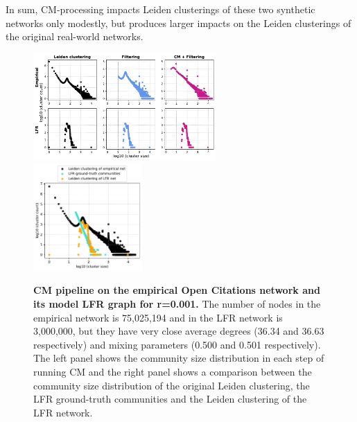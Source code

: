 \documentclass[11pt]{article}   	%
\begin{document}
 In sum, CM-processing impacts Leiden clusterings of these two synthetic networks only modestly, but produces larger impacts on the Leiden clusterings of
 the original real-world networks.



\begin{figure}[h!]
\centering
\includegraphics[width=0.62\textwidth]{figs/oc_cm_steps_lfr001.pdf}
\includegraphics[width=0.37\textwidth]{figs/oc_001_cm_size.pdf}
\caption[CM pipeline on the empirical Open Citations network and its model LFR graph for r=0.001]{\textbf{CM pipeline on the empirical Open Citations network and its model LFR graph for r=0.001.} The number of nodes in the empirical network is 75,025,194 and in the LFR network is 3,000,000, but they have very close average degrees (36.34 and 36.63 respectively) and mixing parameters (0.500 and 0.501 respectively). The left panel shows the community size distribution in each step of running CM and the right panel shows a comparison between the community size distribution of the original Leiden clustering, the LFR ground-truth communities and the Leiden clustering of the LFR network.}
\label{fig:oc-cm-lfr-001}
\end{figure}
\end{document}
